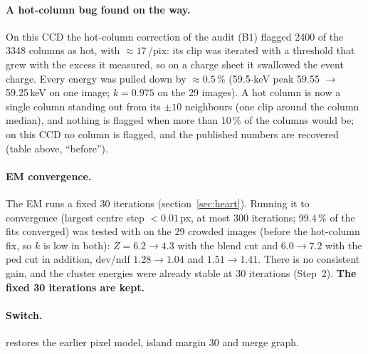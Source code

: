 \paragraph{A hot-column bug found on the way.} On this CCD the hot-column correction of the audit (B1) flagged 2400 of
the 3348 columns as hot, with $\approx17$\,\el/pix: its clip was iterated with a threshold that grew with the excess it
measured, so on a charge sheet it swallowed the event charge. Every energy was pulled down by $\approx0.5\,\%$ (59.5-keV
peak 59.55 $\to$ 59.25\,keV on one image; $k=0.975$ on the 29 images). A hot column is now a single column standing
out from its $\pm10$ neighbours (one clip around the column median), and nothing is flagged when more than 10\,\% of the
columns would be; on this CCD no column is flagged, and the published numbers are recovered (table above, ``before'').

\paragraph{EM convergence.} The EM runs a fixed 30 iterations (section~\ref{sec:heart}). Running it to convergence
(largest centre step $<0.01$\,px, at most 300 iterations; 99.4\,\% of the fits converged) was tested with \AGMX{} on the
29 crowded images (before the hot-column fix, so $k$ is low in both): $Z=6.2\to4.3$ with the blend cut and $6.0\to7.2$
with the ped cut in addition, dev/ndf $1.28\to1.04$ and $1.51\to1.41$. There is no consistent gain, and the cluster
energies were already stable at 30 iterations (Step~2). \textbf{The fixed 30 iterations are kept.}


\paragraph{Switch.}  restores the earlier pixel model, island margin 30 and merge graph.

